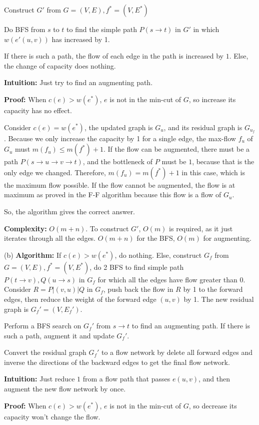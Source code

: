 \documentclass{article}
\newcommand{\algorithm}{\textbf{Algorithm:} }
\newcommand{\proof}{\textbf{Proof:} }
\newcommand{\intuition}{\textbf{Intuition:} }
\newcommand{\complexity}{\textbf{Complexity:} }
\begin{document}
\begin{enumerate}[topsep=0pt]
Construct $G'$ from $G=(V,E),f^*=(V,E^*)$

Do BFS from $s$ to $t$ to find the simple path $P(s\rightarrow t)$
in $G'$ in which $w(e'(u,v))$ has increased by 1.

If there is such a path, the flow of each edge in the path is increased by $1$.
Else, the change of capacity does nothing.

\intuition
Just try to find an augmenting path.

\proof
When $c(e)>w(e^*)$, $e$ is not in the min-cut of $G$, so increase its capacity has no effect.

Consider $c(e)=w(e^*)$, the updated graph is $G_u$, and its residual graph is $G_{u_f}$.
Because we only increase the capacity by 1 for a single edge,
the max-flow $f_u$ of $G_u$ must $m(f_u)\le m(f^*)+1$.
If the flow can be augmented, 
there must be a path $P(s\rightarrow u\rightarrow v\rightarrow t)$,
and the bottleneck of $P$ must be $1$,
because that is the only edge we changed.
Therefore, $m(f_u)=m(f^*)+1$ in this case, which is the maximum flow possible.
If the flow cannot be augmented, the flow is at maximum as proved in the F-F algorithm because this flow is a flow of $G_u$.

So, the algorithm gives the correct answer.

\complexity
$O(m+n)$. 
To construct $G'$, $O(m)$ is required, 
as it just iterates through all the edges. 
$O(m+n)$ for the BFS, $O(m)$ for augmenting.

(b) \algorithm
If $c(e)>w(e^*)$, do nothing.
Else, construct $G_f$ from $G=(V,E),f^*=(V,E^*)$,
do 2 BFS to find simple path $P(t\rightarrow v),Q(u\rightarrow s)$ in $G_f$
for which all the edges have flow greater than 0.
Consider $R=P|(v,u)|Q$ in $G_f$, push back the flow in $R$ by 1 to the forward edges, 
then reduce the weight of the forward edge $(u,v)$ by 1.
The new residual graph is $G_f'=(V,E_f')$.

Perform a BFS search on $G_f'$ from $s\rightarrow t$ to find an augmenting path.
If there is such a path, augment it and update $G_f'$.

Convert the residual graph $G_f'$ to a flow network by delete all forward edges
and inverse the directions of the backward edges to get the final flow network.

\intuition
Just reduce $1$ from a flow path that passes $e(u,v)$,
and then augment the new flow network by once.

\proof
When $c(e)>w(e^*)$, $e$ is not in the min-cut of $G$, so decrease its capacity won't change the flow.


\end{enumerate}
\end{document}
